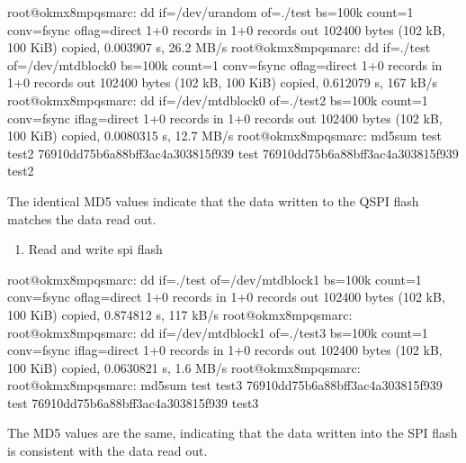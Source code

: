 \documentclass[letterpaper,10pt,openany,english]{sphinxmanual}
\begin{document}
\begin{sphinxVerbatim}[commandchars=\\\{\}]
root@ok\PYGZhy{}mx8mpq\PYGZhy{}smarc:\PYGZti{}\PYGZsh{} dd if=/dev/urandom of=./test bs=100k count=1 conv=fsync oflag=direct
1+0 records in
1+0 records out
102400 bytes (102 kB, 100 KiB) copied, 0.003907 s, 26.2 MB/s
root@ok\PYGZhy{}mx8mpq\PYGZhy{}smarc:\PYGZti{}\PYGZsh{} dd if=./test of=/dev/mtdblock0 bs=100k count=1 conv=fsync oflag=direct
1+0 records in
1+0 records out
102400 bytes (102 kB, 100 KiB) copied, 0.612079 s, 167 kB/s
root@ok\PYGZhy{}mx8mpq\PYGZhy{}smarc:\PYGZti{}\PYGZsh{} dd if=/dev/mtdblock0 of=./test2 bs=100k count=1 conv=fsync iflag=direct 
1+0 records in
1+0 records out
102400 bytes (102 kB, 100 KiB) copied, 0.0080315 s, 12.7 MB/s
root@ok\PYGZhy{}mx8mpq\PYGZhy{}smarc:\PYGZti{}\PYGZsh{} md5sum test test2
76910dd75b6a88bff3ac4a303815f939  test
76910dd75b6a88bff3ac4a303815f939  test2
\end{sphinxVerbatim}

\sphinxAtStartPar
The identical MD5 values indicate that the data written to the QSPI flash matches the data read out.
\begin{enumerate}
%
\setcounter{enumi}{1}
\item {} 
\sphinxAtStartPar
Read and write spi flash

\end{enumerate}

\begin{sphinxVerbatim}[commandchars=\\\{\}]
root@ok\PYGZhy{}mx8mpq\PYGZhy{}smarc:\PYGZti{}\PYGZsh{} dd if=./test of=/dev/mtdblock1 bs=100k count=1 conv=fsync oflag=direct
1+0 records in
1+0 records out
102400 bytes (102 kB, 100 KiB) copied, 0.874812 s, 117 kB/s
root@ok\PYGZhy{}mx8mpq\PYGZhy{}smarc:\PYGZti{}\PYGZsh{} 
root@ok\PYGZhy{}mx8mpq\PYGZhy{}smarc:\PYGZti{}\PYGZsh{} dd if=/dev/mtdblock1 of=./test3 bs=100k count=1 conv=fsync iflag=direct 
1+0 records in
1+0 records out
102400 bytes (102 kB, 100 KiB) copied, 0.0630821 s, 1.6 MB/s
root@ok\PYGZhy{}mx8mpq\PYGZhy{}smarc:\PYGZti{}\PYGZsh{} 
root@ok\PYGZhy{}mx8mpq\PYGZhy{}smarc:\PYGZti{}\PYGZsh{} md5sum test test3
76910dd75b6a88bff3ac4a303815f939  test
76910dd75b6a88bff3ac4a303815f939  test3
\end{sphinxVerbatim}

\sphinxAtStartPar
The MD5 values are the same, indicating that the data written into the SPI flash is consistent with the data read out.
\end{document}
